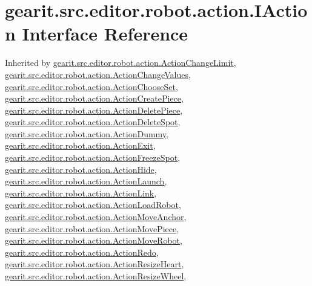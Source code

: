 \hypertarget{interfacegearit_1_1src_1_1editor_1_1robot_1_1action_1_1_i_action}{\section{gearit.\+src.\+editor.\+robot.\+action.\+I\+Action Interface Reference}
\label{interfacegearit_1_1src_1_1editor_1_1robot_1_1action_1_1_i_action}
}


Inherited by \hyperlink{classgearit_1_1src_1_1editor_1_1robot_1_1action_1_1_action_change_limit}{gearit.\+src.\+editor.\+robot.\+action.\+Action\+Change\+Limit}, \hyperlink{classgearit_1_1src_1_1editor_1_1robot_1_1action_1_1_action_change_values}{gearit.\+src.\+editor.\+robot.\+action.\+Action\+Change\+Values}, \hyperlink{classgearit_1_1src_1_1editor_1_1robot_1_1action_1_1_action_choose_set}{gearit.\+src.\+editor.\+robot.\+action.\+Action\+Choose\+Set}, \hyperlink{classgearit_1_1src_1_1editor_1_1robot_1_1action_1_1_action_create_piece}{gearit.\+src.\+editor.\+robot.\+action.\+Action\+Create\+Piece}, \hyperlink{classgearit_1_1src_1_1editor_1_1robot_1_1action_1_1_action_delete_piece}{gearit.\+src.\+editor.\+robot.\+action.\+Action\+Delete\+Piece}, \hyperlink{classgearit_1_1src_1_1editor_1_1robot_1_1action_1_1_action_delete_spot}{gearit.\+src.\+editor.\+robot.\+action.\+Action\+Delete\+Spot}, \hyperlink{classgearit_1_1src_1_1editor_1_1robot_1_1action_1_1_action_dummy}{gearit.\+src.\+editor.\+robot.\+action.\+Action\+Dummy}, \hyperlink{classgearit_1_1src_1_1editor_1_1robot_1_1action_1_1_action_exit}{gearit.\+src.\+editor.\+robot.\+action.\+Action\+Exit}, \hyperlink{classgearit_1_1src_1_1editor_1_1robot_1_1action_1_1_action_freeze_spot}{gearit.\+src.\+editor.\+robot.\+action.\+Action\+Freeze\+Spot}, \hyperlink{classgearit_1_1src_1_1editor_1_1robot_1_1action_1_1_action_hide}{gearit.\+src.\+editor.\+robot.\+action.\+Action\+Hide}, \hyperlink{classgearit_1_1src_1_1editor_1_1robot_1_1action_1_1_action_launch}{gearit.\+src.\+editor.\+robot.\+action.\+Action\+Launch}, \hyperlink{classgearit_1_1src_1_1editor_1_1robot_1_1action_1_1_action_link}{gearit.\+src.\+editor.\+robot.\+action.\+Action\+Link}, \hyperlink{classgearit_1_1src_1_1editor_1_1robot_1_1action_1_1_action_load_robot}{gearit.\+src.\+editor.\+robot.\+action.\+Action\+Load\+Robot}, \hyperlink{classgearit_1_1src_1_1editor_1_1robot_1_1action_1_1_action_move_anchor}{gearit.\+src.\+editor.\+robot.\+action.\+Action\+Move\+Anchor}, \hyperlink{classgearit_1_1src_1_1editor_1_1robot_1_1action_1_1_action_move_piece}{gearit.\+src.\+editor.\+robot.\+action.\+Action\+Move\+Piece}, \hyperlink{classgearit_1_1src_1_1editor_1_1robot_1_1action_1_1_action_move_robot}{gearit.\+src.\+editor.\+robot.\+action.\+Action\+Move\+Robot}, \hyperlink{classgearit_1_1src_1_1editor_1_1robot_1_1action_1_1_action_redo}{gearit.\+src.\+editor.\+robot.\+action.\+Action\+Redo}, \hyperlink{classgearit_1_1src_1_1editor_1_1robot_1_1action_1_1_action_resize_heart}{gearit.\+src.\+editor.\+robot.\+action.\+Action\+Resize\+Heart}, \hyperlink{classgearit_1_1src_1_1editor_1_1robot_1_1action_1_1_action_resize_wheel}{gearit.\+src.\+editor.\+robot.\+action.\+Action\+Resize\+Wheel}, 